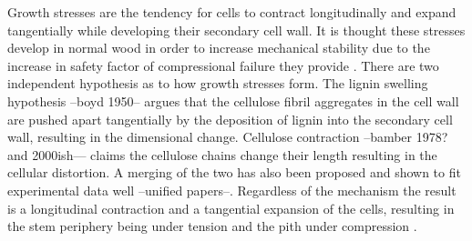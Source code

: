 Growth stresses are the tendency for cells to contract longitudinally and expand tangentially while developing their secondary cell wall. It is thought these stresses develop in normal wood in order to increase mechanical stability due to the increase in safety factor of compressional failure they provide \cite{mattheck1997wood}. There are two independent hypothesis as to how growth stresses form. The lignin swelling hypothesis --boyd 1950-- argues that the cellulose fibril aggregates in the cell wall are pushed apart tangentially by the deposition of lignin into the secondary cell wall, resulting in the dimensional change. Cellulose contraction --bamber 1978? and 2000ish--- claims the cellulose chains change their length resulting in the cellular distortion. A merging of the two has also been proposed and shown to fit experimental data well --unified papers--. Regardless of the mechanism the result is a longitudinal contraction and a tangential expansion of the cells, resulting in the stem periphery being under tension and the pith under compression \cite{Archer_1987}. 